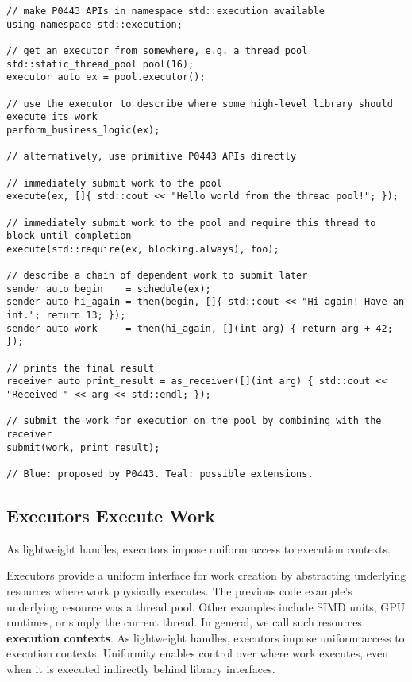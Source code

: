\documentclass[a4paper,12pt,notitlepage,twoside,openright]{article}
\begin{document}
\begin{verbatim}
// make P0443 APIs in namespace std::execution available
using namespace std::execution;

// get an executor from somewhere, e.g. a thread pool
std::static_thread_pool pool(16);
executor auto ex = pool.executor();

// use the executor to describe where some high-level library should execute its work
perform_business_logic(ex);

// alternatively, use primitive P0443 APIs directly

// immediately submit work to the pool
execute(ex, []{ std::cout << "Hello world from the thread pool!"; });

// immediately submit work to the pool and require this thread to block until completion
execute(std::require(ex, blocking.always), foo);

// describe a chain of dependent work to submit later
sender auto begin    = schedule(ex);
sender auto hi_again = then(begin, []{ std::cout << "Hi again! Have an int."; return 13; });
sender auto work     = then(hi_again, [](int arg) { return arg + 42; });

// prints the final result
receiver auto print_result = as_receiver([](int arg) { std::cout << "Received " << arg << std::endl; });

// submit the work for execution on the pool by combining with the receiver
submit(work, print_result);

// Blue: proposed by P0443. Teal: possible extensions.
\end{verbatim}

\hypertarget{executors-execute-work}{%
\subsection{Executors Execute Work}\label{executors-execute-work}}

As lightweight handles, executors impose uniform access to execution
contexts.

Executors provide a uniform interface for work creation by abstracting
underlying resources where work physically executes. The previous code
example's underlying resource was a thread pool. Other examples include
SIMD units, GPU runtimes, or simply the current thread. In general, we
call such resources \textbf{execution contexts}. As lightweight handles,
executors impose uniform access to execution contexts. Uniformity
enables control over where work executes, even when it is executed
indirectly behind library interfaces.
\end{document}
